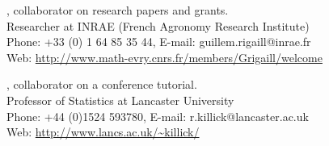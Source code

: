 \documentclass[margin,line]{res}
\begin{document}
\begin{resume}
, collaborator on research papers and grants.\\
Researcher at INRAE (French Agronomy Research Institute)\\
Phone: +33 (0) 1 64 85 35 44, E-mail: guillem.rigaill@inrae.fr\\
Web: \url{http://www.math-evry.cnrs.fr/members/Grigaill/welcome}

, collaborator on a conference tutorial.\\
Professor of Statistics at Lancaster University\\
Phone: +44 (0)1524 593780, E-mail: r.killick@lancaster.ac.uk\\
Web: \url{http://www.lancs.ac.uk/~killick/}

\end{resume}
\end{document}
